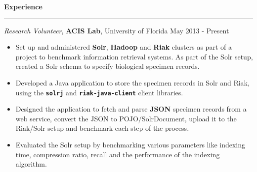 \documentclass[10pt]{article}
\begin{document}
\textbf{Experience}
\smallskip
\hrule
\textit{Research Volunteer}, {\bf ACIS Lab}, University of Florida \hfill May 2013 - Present
\begin{itemize}
    \item Set up and administered \textbf{Solr}, \textbf{Hadoop} and \textbf{Riak} 
clusters as part of a project to benchmark information retrieval systems. As part of the Solr setup, created a Solr schema to specify biological specimen records.
    \item Developed a Java application to store the specimen records in Solr and Riak, using the \texttt{\bf solrj} and \texttt{\bf riak-java-client} client libraries.
    \item Designed the application to fetch and parse \textbf{JSON} specimen records from a web service, convert the JSON to POJO/SolrDocument, upload it to the Riak/Solr
setup and benchmark each step of the process.
    \item Evaluated the Solr setup by benchmarking various parameters like indexing time, compression ratio, recall and the performance of the indexing algorithm.
\end{itemize}
\end{document}
